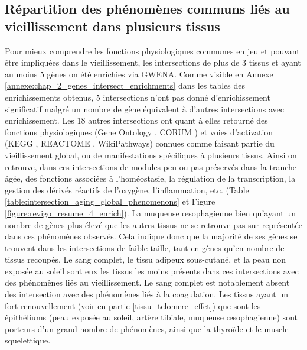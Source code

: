 \subsection{Répartition des phénomènes communs liés au vieillissement dans plusieurs tissus}

Pour mieux comprendre les fonctions physiologiques communes en jeu et pouvant être impliquées dans le vieillissement, les intersections de plus de 3 tissus et ayant au moins 5 gènes on été enrichies via GWENA. Comme visible en Annexe \ref{annexe:chap_2_genes_intersect_enrichments} dans les tables des enrichissements obtenus, 5 intersections n'ont pas donné d'enrichissement significatif malgré un nombre de gène équivalent à d'autres intersections avec enrichissement. Les 18 autres intersections ont quant à elles retourné des fonctions physiologiques (Gene Ontology \cite{Ashburner2000}, CORUM \cite{Ruepp2008}) et voies d'activation (KEGG \cite{Kanehisa2019}, REACTOME \cite{Fabregat2016}, WikiPathways\cite{Slenter2018}) connues comme faisant partie du vieillissement global, ou de manifestations spécifiques à plusieurs tissus. Ainsi on retrouve, dans ces intersections de modules peu ou pas préservés dans la tranche âgée, des fonctions associées à l'homéostasie, la régulation de la transcription, la gestion des dérivés réactifs de l'oxygène, l'inflammation, etc. (Table \ref{table:intersection_aging_global_phenomenons} et Figure \ref{figure:revigo_resume_4_enrich}). La muqueuse œsophagienne bien qu'ayant un nombre de gènes plus élevé que les autres tissus ne se retrouve pas sur-représentée dans ces phénomènes observés. Cela indique donc que la majorité de ses gènes se trouvent dans les intersections de faible taille, tant en gènes qu'en nombre de tissus recoupés. Le sang complet, le tissu adipeux sous-cutané, et la peau non exposée au soleil sont eux les tissus les moins présents dans ces intersections avec des phénomènes liés au vieillissement. Le sang complet est notablement absent des intersection avec des phénomènes liés à la coagulation. Les tissus ayant un fort renouvellement (voir en partie \ref{tissu_telomere_effet}) que sont les épithéliums (peau exposée au soleil, artère tibiale, muqueuse œsophagienne) sont porteurs d'un grand nombre de phénomènes, ainsi que la thyroïde et le muscle squelettique. 


